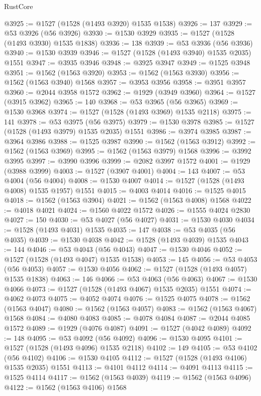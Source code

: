 \begin{lexlean}{RustCore}
\begin{coremodule}
@3925 := @1527 (@1528 (@1493 @3920) @1535 @1538)
@3926 := 137
@3929 := @53 @3926 (@56 @3926)
@3930 := @1530 @3929
@3935 := @1527 (@1528 (@1493 @3930) @1535 @1838)
@3936 := 138
@3939 := @53 @3936 (@56 @3936)
@3940 := @1530 @3939
@3946 := @1527 (@1528 (@1493 @3940) @1535 @2035) @1551
@3947 := @3935 @3946
@3948 := @3925 @3947
@3949 := @1525 @3948
@3951 := @1562 (@1563 @3920)
@3953 := @1562 (@1563 @3930)
@3956 := @1562 (@1563 @3940) @1568
@3957 := @3953 @3956
@3958 := @3951 @3957
@3960 := @2044 @3958 @1572
@3962 := @1929 (@3949 @3960)
@3964 := @1527 (@3915 @3962)
@3965 := 140
@3968 := @53 @3965 (@56 @3965)
@3969 := @1530 @3968
@3974 := @1527 (@1528 (@1493 @3969) @1535 @2118)
@3975 := 141
@3978 := @53 @3975 (@56 @3975)
@3979 := @1530 @3978
@3985 := @1527 (@1528 (@1493 @3979) @1535 @2035) @1551
@3986 := @3974 @3985
@3987 := @3964 @3986
@3988 := @1525 @3987
@3990 := @1562 (@1563 @3912)
@3992 := @1562 (@1563 @3969)
@3995 := @1562 (@1563 @3979) @1568
@3996 := @3992 @3995
@3997 := @3990 @3996
@3999 := @2082 @3997 @1572
@4001 := @1929 (@3988 @3999)
@4003 := @1527 (@3907 @4001)
@4004 := 143
@4007 := @53 @4004 (@56 @4004)
@4008 := @1530 @4007
@4014 := @1527 (@1528 (@1493 @4008) @1535 @1957) @1551
@4015 := @4003 @4014
@4016 := @1525 @4015
@4018 := @1562 (@1563 @3904)
@4021 := @1562 (@1563 @4008) @1568
@4022 := @4018 @4021
@4024 := @1560 @4022 @1572
@4026 := @1555 @4024 @2830
@4027 := 150
@4030 := @53 @4027 (@56 @4027)
@4031 := @1530 @4030
@4034 := @1528 (@1493 @4031) @1535
@4035 := 147
@4038 := @53 @4035 (@56 @4035)
@4039 := @1530 @4038
@4042 := @1528 (@1493 @4039) @1535
@4043 := 144
@4046 := @53 @4043 (@56 @4043)
@4047 := @1530 @4046
@4052 := @1527 (@1528 (@1493 @4047) @1535 @1538)
@4053 := 145
@4056 := @53 @4053 (@56 @4053)
@4057 := @1530 @4056
@4062 := @1527 (@1528 (@1493 @4057) @1535 @1838)
@4063 := 146
@4066 := @53 @4063 (@56 @4063)
@4067 := @1530 @4066
@4073 := @1527 (@1528 (@1493 @4067) @1535 @2035) @1551
@4074 := @4062 @4073
@4075 := @4052 @4074
@4076 := @1525 @4075
@4078 := @1562 (@1563 @4047)
@4080 := @1562 (@1563 @4057)
@4083 := @1562 (@1563 @4067) @1568
@4084 := @4080 @4083
@4085 := @4078 @4084
@4087 := @2044 @4085 @1572
@4089 := @1929 (@4076 @4087)
@4091 := @1527 (@4042 @4089)
@4092 := 148
@4095 := @53 @4092 (@56 @4092)
@4096 := @1530 @4095
@4101 := @1527 (@1528 (@1493 @4096) @1535 @2118)
@4102 := 149
@4105 := @53 @4102 (@56 @4102)
@4106 := @1530 @4105
@4112 := @1527 (@1528 (@1493 @4106) @1535 @2035) @1551
@4113 := @4101 @4112
@4114 := @4091 @4113
@4115 := @1525 @4114
@4117 := @1562 (@1563 @4039)
@4119 := @1562 (@1563 @4096)
@4122 := @1562 (@1563 @4106) @1568

\end{coremodule}
\end{lexlean}
